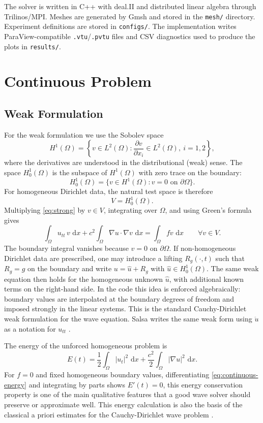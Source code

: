 \documentclass[11pt,a4paper]{article}
\newcommand{\dd}{\,\mathrm{d}}
\begin{document}
The solver is written in C++ with deal.II and distributed linear algebra through
Trilinos/MPI.  Meshes are generated by Gmsh and stored in the \texttt{mesh/}
directory. Experiment definitions are stored in \texttt{configs/}.  The
implementation writes ParaView-compatible \texttt{.vtu}/\texttt{.pvtu} files and
CSV diagnostics used to produce the plots in \texttt{results/}.

\section{Continuous Problem}

\subsection{Weak Formulation}

For the weak formulation we use the Sobolev space
\[
H^1(\Omega)
=\left\{v\in L^2(\Omega): \frac{\partial v}{\partial x_i}\in L^2(\Omega),
\ i=1,2\right\},
\]
where the derivatives are understood in the distributional (weak) sense.  The space
$H_0^1(\Omega)$ is the subspace of $H^1(\Omega)$ with zero trace on the
boundary:
\[
H_0^1(\Omega)=\{v\in H^1(\Omega): v=0 \text{ on } \partial\Omega\}.
\]
For homogeneous Dirichlet data, the natural test space is therefore
\[
V = H_0^1(\Omega).
\]
Multiplying \eqref{eq:strong} by $v\in V$, integrating over $\Omega$, and using
Green's formula gives
\begin{equation}
\int_\Omega u_{tt}\,v\,\dd x
+ c^2\int_\Omega \nabla u\cdot\nabla v\,\dd x
= \int_\Omega f v\,\dd x
\qquad \forall v\in V.
\label{eq:weak}
\end{equation}
The boundary integral vanishes because $v=0$ on $\partial\Omega$.  If
non-homogeneous Dirichlet data are prescribed, one may introduce a lifting
$R_g(\cdot,t)$ such that $R_g=g$ on the boundary and write
$u=\widehat u+R_g$ with $\widehat u\in H_0^1(\Omega)$.  The same weak equation
then holds for the homogeneous unknown $\widehat u$, with additional known
terms on the right-hand side.  In the code this idea is enforced algebraically:
boundary values are interpolated at the boundary degrees of freedom and imposed
strongly in the linear systems.  This is the standard Cauchy-Dirichlet weak
formulation for the wave equation. Salsa writes the same weak form using
$\ddot u$ as a notation for $u_{tt}$ \cite{salsa}.

The energy of the unforced homogeneous problem is
\begin{equation}
E(t)=\frac12\int_\Omega |u_t|^2\,\dd x
    +\frac{c^2}{2}\int_\Omega |\nabla u|^2\,\dd x .
\label{eq:continuous-energy}
\end{equation}
For $f=0$ and fixed homogeneous boundary values, differentiating
\eqref{eq:continuous-energy} and integrating by parts shows $E'(t)=0$, this
energy conservation property is one of the main qualitative features that a
good wave solver should preserve or approximate well.  This energy calculation
is also the basis of the classical a priori estimates for the Cauchy-Dirichlet
wave problem \cite{salsa}.
\end{document}

